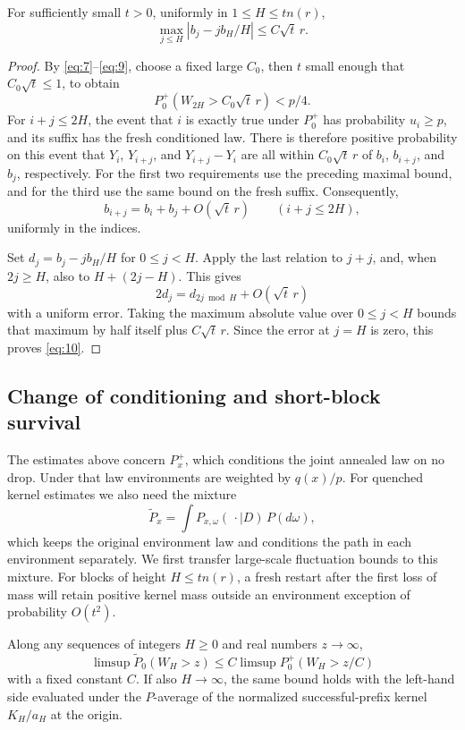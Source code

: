 \begin{lemma}
\label{fluct-median-linearization}
For sufficiently small \(t>0\), uniformly in
\(1\le H\le tn(r)\),
\[
\max_{j\le H}|b_j-jb_H/H|\le C\sqrt t\,r.
\tag{10}\label{eq:10}
\]
\end{lemma}

\begin{proof}
By \eqref{eq:7}--\eqref{eq:9}, choose a fixed large \(C_0\), then
\(t\) small enough that \(C_0\sqrt t\le1\), to obtain
\[
P_0^+(W_{2H}>C_0\sqrt t\,r)<p/4.
\]
For \(i+j\le2H\), the event that \(i\) is exactly true under \(P_0^+\)
has probability \(u_i\ge p\), and its suffix has the fresh conditioned
law. There is therefore positive probability on this event that
\(Y_i\), \(Y_{i+j}\), and \(Y_{i+j}-Y_i\) are all within
\(C_0\sqrt t\,r\) of \(b_i\), \(b_{i+j}\), and \(b_j\), respectively.
For the first two requirements use the preceding maximal bound, and
for the third use the same bound on the fresh suffix. Consequently,
\[
b_{i+j}=b_i+b_j+O(\sqrt t\,r)
\qquad(i+j\le2H),
\]
uniformly in the indices.

Set \(d_j=b_j-jb_H/H\) for \(0\le j<H\). Apply the last relation to
\(j+j\), and, when \(2j\ge H\), also to \(H+(2j-H)\). This gives
\[
2d_j=d_{2j\bmod H}+O(\sqrt t\,r)
\]
with a uniform error. Taking the maximum absolute value over
\(0\le j<H\) bounds that maximum by half itself plus
\(C\sqrt t\,r\). Since the error at \(j=H\) is zero, this proves
\eqref{eq:10}.
\end{proof}

\subsection{Change of conditioning and short-block survival}

The estimates above concern \(P_x^+\), which conditions the joint
annealed law on no drop. Under that law environments are weighted by
\(q(x)/p\). For quenched kernel estimates we also need the mixture
\[
\widetilde P_x
 =\int P_{x,\omega}(\,\cdot\mid D)\,P(d\omega),
\]
which keeps the original environment law and conditions the path in
each environment separately. We first transfer large-scale fluctuation
bounds to this mixture. For blocks of height \(H\le tn(r)\), a fresh
restart after the first loss of mass will retain positive kernel mass
outside an environment exception of probability \(O(t^2)\).

\begin{lemma}
\label{fluct-conditioning-transfer}
Along any sequences of integers \(H\ge0\) and real numbers
\(z\to\infty\),
\[
\limsup\widetilde P_0(W_H>z)
 \le C\limsup P_0^+(W_H>z/C)
\tag{11}\label{eq:11}
\]
with a fixed constant \(C\). If also \(H\to\infty\), the same bound
holds with the left-hand side evaluated under the \(P\)-average of
the normalized successful-prefix kernel \(K_H/a_H\) at the origin.
\end{lemma}

